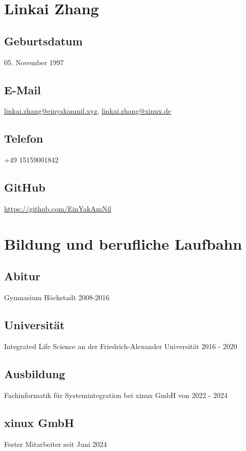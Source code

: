 \documentclass{article}
\begin{document}
\author{Linkai Zhang}

\section{Linkai Zhang}

\subsection{Geburtsdatum}
05. November 1997

\subsection{E-Mail}
\href{linkai.zhang@einyamkamnil.xyz}{linkai.zhang@einyakamnil.xyz},
\href{linkai.zhang@xinux.de}{linkai.zhang@xinux.de}

\subsection{Telefon}
+49 15159001842

\subsection{GitHub}
\href{https://github.com/EinYakAmNil}{https://github.com/EinYakAmNil}

\section{Bildung und berufliche Laufbahn}

\subsection{Abitur}
Gymnasium Höchstadt 2008-2016

\subsection{Universität}
Integrated Life Science an der Friedrich-Alexander Universität 2016 - 2020

\subsection{Ausbildung}
Fachinformatik für Systemintegration bei xinux GmbH von 2022 - 2024

\subsection{xinux GmbH}
Fester Mitarbeiter seit Juni 2024
\end{document}
